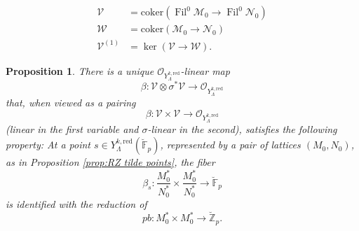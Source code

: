 \documentclass[10pt,a4paper]{amsart}
\newtheorem{proposition}{Proposition}
\newcommand{\F}{\mathbb F}
\DeclareMathOperator{\Fil}{Fil}
\newcommand{\Z}{\mathbb Z}
\newcommand{\co}{\mathcal O}
\newcommand{\red}{\mathrm{red}}
\begin{document}
\begin{align}
\mathscr{V}  &= \mathrm{coker}( \Fil^0 \mathscr{M}_0 \to \Fil^0 \mathscr{N}_0 )  \label{VWdef}  \\
\mathscr{W}  & = \mathrm{coker}(  \mathscr{M}_0 \to  \mathscr{N}_0 ) \nonumber  \\
\mathscr{V}^{(1)} & = \ker(  \mathscr{V} \to \mathscr{W}   ) .  \nonumber
\end{align}

\begin{proposition}\label{prop:beta def}
There is a  unique  $\co_{Y_\Lambda^{k,\red}}$-linear map
\[
\beta : \mathscr{V} \otimes \sigma^*\mathscr{V} \to \co_{Y_\Lambda^{k,\red}}
\]
that, when viewed as a pairing 
\[
\beta : \mathscr{V} \times \mathscr{V} \to \co_{Y_\Lambda^{k,\red}}
\]
(linear in the first variable and $\sigma$-linear in the second),  satisfies the following property:
At a point $s \in Y_\Lambda^{k,\red}(\breve{\F}_p)$,  represented by a pair of lattices $(M_0,N_0)$, 
 as in Proposition \ref{prop:RZ tilde points}, the fiber 
\[
\beta_s : \frac{M_0^*}{N_0^*} \times \frac{M_0^*}{N_0^*} \to \breve{\F}_p
\]
is identified with the reduction  of 
\[
pb : M_0^* \times M_0^* \to  \breve{\Z}_p .
\]
\end{proposition}
\end{document}

